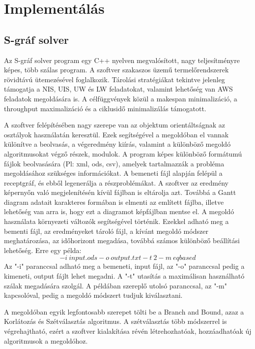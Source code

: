 \chapter{Implementálás}
\section{S-gráf solver}
Az S-gráf solver program egy C++ nyelven megvalósított, nagy teljesítményre képes, több szálas program.
A szoftver szakaszos üzemű termelőrendszerek rövidtávú ütemezésével foglalkozik.
Tárolási stratégiákat tekintve jelenleg támogatja a NIS, UIS, UW és LW feladatokat, valamint lehetőség van AWS feladatok megoldására is.
A célfüggvények közül a makespan minimalizáció, a throughput maximalizáció és a ciklusidő minimalizálás támogatott. 

A szoftver felépítésében nagy szerepe van az objektum orientáltságnak az osztályok használatán keresztül.
Ezek segítségével a megoldóban el vannak különítve a beolvasás, a végeredmény kiírás, valamint a különböző megoldó algoritmusokat végző részek, modulok.
A program képes különböző formátumú fájlok beolvasására (Pl: xml, ods, csv), amelyek tartalmazzák a probléma megoldásához szükséges információkat.
A bemeneti fájl alapján felépül a receptgráf, és ebből legenerálja a részproblémákat.
A szoftver az eredmény képernyőn való megjelenítésén kívül fájlban is eltárolja azt.
Továbbá a Gantt diagram adatait karakteres formában is elmenti az említett fájlba, illetve lehetőség van arra is, hogy ezt a diagramot képfájlban mentse el.
A megoldó használata környezeti változók segítségével történik.
Ezekkel adható meg a bementi fájl, az eredményeket tároló fájl, a kívánt megoldó módszer meghatározása, az időhorizont megadása, továbbá számos különböző beállítási lehetőség.
Erre egy példa: $$-i\:input.ods -o\: output.txt -t\:2 -m\:eqbased$$ 
Az "-i" paranccsal adható meg a bemeneti, input fájl, az "-o" paranccsal pedig a kimeneti, output fájlt lehet megadni.
A "-t" utasítás a maximálisan használható szálak megadására szolgál.
A példában szereplő utolsó paranccsal, az "-m" kapcsolóval, pedig a megoldó módszert tudjuk kiválasztani.

A megoldóban egyik legfontosabb szerepet tölti be a Branch and Bound, azaz a Korlátozás és Szétválasztás algoritmus.
A szétválasztás több módszerrel is végrehajtható, ezért a szoftver kialakítása révén létrehozhatóak, hozzáadhatóak új algoritmusok a megoldóhoz.

